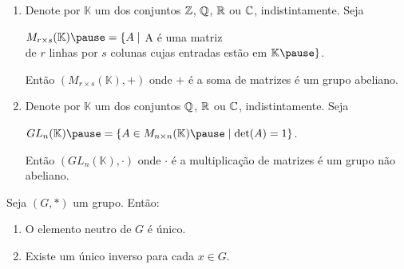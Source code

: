 \documentclass{beamer}
\begin{document}
    \begin{frame}
        \begin{exemplos}
            \begin{enumerate}[label={\arabic*})]
                \conti

                \item Denote por $\mathbb{K}$ \pause um dos conjuntos $\mathbb{Z}$, \pause $\mathbb{Q}$, \pause $\mathbb{R}$ \pause ou $\mathbb{C}$, \pause indistintamente. Seja \pause
                \begin{center}
                    $M_{r \times s}(\mathbb{K}) \pause = \{A \mid $ A \'e uma matriz \pause \\de $r$ linhas \pause por $s$ \pause colunas cujas entradas est\~ao em $\mathbb{K} \pause\}$.
                \end{center}
                Ent\~ao $(M_{r \times s}(\mathbb{K}), +)$ \pause onde $+$ \'e a soma de matrizes \pause \'e um grupo abeliano. \pause

                \vspace{.3cm}

                \item Denote por $\mathbb{K}$ \pause um dos conjuntos $\mathbb{Q}$, \pause $\mathbb{R}$ \pause ou $\mathbb{C}$, \pause indistintamente. Seja \pause
                \begin{center}
                    $GL_n(\mathbb{K}) \pause = \{A \in M_{n \times n}(\mathbb{K}) \pause \mid \det(A) = 1\}$. \pause
                \end{center}
                Ent\~ao $(GL_n(\mathbb{K}), \cdot)$ \pause onde $\cdot$ \'e a multiplica\c{c}\~ao de matrizes \'e um grupo \pause n\~ao abeliano. \pause
            \end{enumerate}
        \end{exemplos}
    \end{frame}

    \begin{frame}
        \begin{proposicao}
            Seja $(G,*)$ um grupo. \pause Ent\~ao:\pause
            \begin{enumerate}[label={\roman*})]
                \item O elemento neutro de $G$ {\'e} {\'u}nico.\pause

                \vspace{.3cm}

                \item Existe um {\'u}nico inverso para cada $x \in G$.

                \seti
            \end{enumerate}
        \end{proposicao}
    \end{frame}
\end{document}
